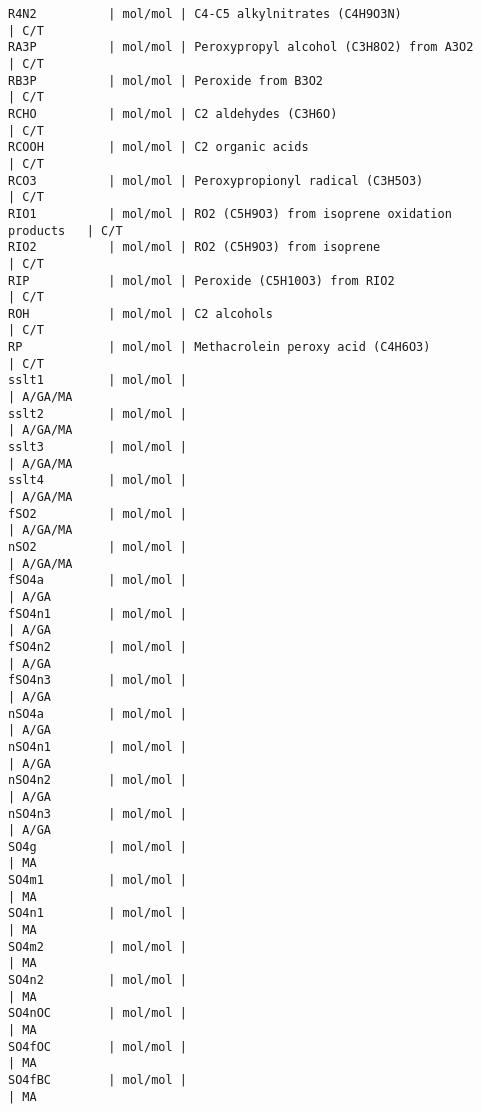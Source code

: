 {\begin{verbatim}
R4N2          | mol/mol | C4-C5 alkylnitrates (C4H9O3N)                   | C/T
RA3P          | mol/mol | Peroxypropyl alcohol (C3H8O2) from A3O2         | C/T
RB3P          | mol/mol | Peroxide from B3O2                              | C/T
RCHO          | mol/mol | C2 aldehydes (C3H6O)                            | C/T
RCOOH         | mol/mol | C2 organic acids                                | C/T
RCO3          | mol/mol | Peroxypropionyl radical (C3H5O3)                | C/T
RIO1          | mol/mol | RO2 (C5H9O3) from isoprene oxidation products   | C/T
RIO2          | mol/mol | RO2 (C5H9O3) from isoprene                      | C/T
RIP           | mol/mol | Peroxide (C5H10O3) from RIO2                    | C/T
ROH           | mol/mol | C2 alcohols                                     | C/T
RP            | mol/mol | Methacrolein peroxy acid (C4H6O3)               | C/T
sslt1         | mol/mol |                                                 | A/GA/MA
sslt2         | mol/mol |                                                 | A/GA/MA
sslt3         | mol/mol |                                                 | A/GA/MA
sslt4         | mol/mol |                                                 | A/GA/MA
fSO2          | mol/mol |                                                 | A/GA/MA
nSO2          | mol/mol |                                                 | A/GA/MA
fSO4a         | mol/mol |                                                 | A/GA
fSO4n1        | mol/mol |                                                 | A/GA
fSO4n2        | mol/mol |                                                 | A/GA
fSO4n3        | mol/mol |                                                 | A/GA
nSO4a         | mol/mol |                                                 | A/GA
nSO4n1        | mol/mol |                                                 | A/GA
nSO4n2        | mol/mol |                                                 | A/GA
nSO4n3        | mol/mol |                                                 | A/GA
SO4g          | mol/mol |                                                 | MA
SO4m1         | mol/mol |                                                 | MA
SO4n1         | mol/mol |                                                 | MA
SO4m2         | mol/mol |                                                 | MA
SO4n2         | mol/mol |                                                 | MA
SO4nOC        | mol/mol |                                                 | MA
SO4fOC        | mol/mol |                                                 | MA
SO4fBC        | mol/mol |                                                 | MA

\end{verbatim}}
